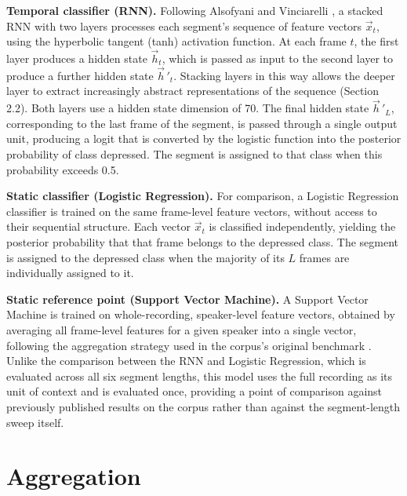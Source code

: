 \documentclass{mproj}
\begin{document}
\textbf{Temporal classifier (RNN).} Following Alsofyani and Vinciarelli \cite{alsofyani2021}, a stacked RNN with two layers processes each segment's sequence of feature vectors $\vec{x}_t$, using the hyperbolic tangent (tanh) activation function. At each frame $t$, the first layer produces a hidden state $\vec{h}_t$, which is passed as input to the second layer to produce a further hidden state $\vec{h}\,'_t$. Stacking layers in this way allows the deeper layer to extract increasingly abstract representations of the sequence (Section 2.2). Both layers use a hidden state dimension of 70. The final hidden state $\vec{h}\,'_L$, corresponding to the last frame of the segment, is passed through a single output unit, producing a logit that is converted by the logistic function into the posterior probability of class depressed. The segment is assigned to that class when this probability exceeds 0.5.


\textbf{Static classifier (Logistic Regression).} For comparison, a Logistic Regression classifier is trained on the same frame-level feature vectors, without access to their sequential structure. Each vector $\vec{x}_t$ is classified independently, yielding the posterior probability that that frame belongs to the depressed class. The segment is assigned to the depressed class when the majority of its $L$ frames are individually assigned to it.

\textbf{Static reference point (Support Vector Machine).} A Support Vector Machine is trained on whole-recording, speaker-level feature vectors, obtained by averaging all frame-level features for a given speaker into a single vector, following the aggregation strategy used in the corpus's original benchmark \cite{tao2023androids}. Unlike the comparison between the RNN and Logistic Regression, which is evaluated across all six segment lengths, this model uses the full recording as its unit of context and is evaluated once, providing a point of comparison against previously published results on the corpus rather than against the segment-length sweep itself.

\section{Aggregation}\label{sec:aggregation}
\end{document}
